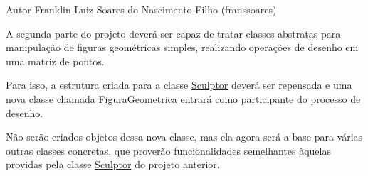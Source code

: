 \begin{DoxyAuthor}{Autor}
Franklin Luiz Soares do Nascimento Filho (franssoares)
\end{DoxyAuthor}
A segunda parte do projeto deverá ser capaz de tratar classes abstratas para manipulação de figuras geométricas simples, realizando operações de desenho em uma matriz de pontos.

Para isso, a estrutura criada para a classe {\ttfamily \mbox{\hyperlink{class_sculptor}{Sculptor}}} deverá ser repensada e uma nova classe chamada {\ttfamily \mbox{\hyperlink{class_figura_geometrica}{Figura\+Geometrica}}} entrará como participante do processo de desenho.

Não serão criados objetos dessa nova classe, mas ela agora será a base para várias outras classes concretas, que proverão funcionalidades semelhantes àquelas providas pela classe {\ttfamily \mbox{\hyperlink{class_sculptor}{Sculptor}}} do projeto anterior. 